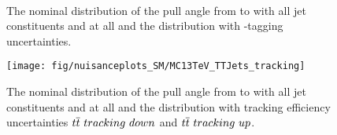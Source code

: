 \begin{description}
  \begin{figure}[hbtp]
  \def\twidth{0.45}
  \centering
  \\
  \caption{The nominal distribution of the pull angle from \leadingjet to \scndleadingjet with all jet constituents and at all \DeltaR and the distribution with \cPqb-tagging uncertainties.}
  \label{fig:MC13TeV_TTJets_btag_csv}

\end{figure}

\begin{figure}[hbtp]
\centering
\def\twidth{0.45}
\texttt{[image: fig/nuisanceplots\_SM/MC13TeV\_TTJets\_tracking]}
\caption{The nominal distribution of the pull angle from \leadingjet to \scndleadingjet with all jet constituents and at all \DeltaR and the distribution with tracking efficiency uncertainties $\ttbar\ tracking\ down$ and $\ttbar\ tracking\ up$.}
\label{fig:MC13TeV_TTJets_tracking}
\end{figure}

\end{description}
\clearpage
